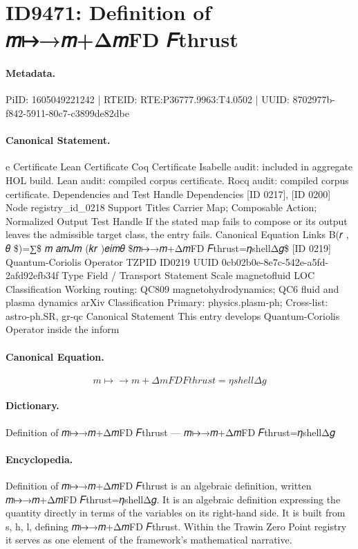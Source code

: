 \section*{ID9471: Definition of 𝑚↦→𝑚+Δ𝑚FD 𝐹thrust}
\paragraph{Metadata.}
PiID: 1605049221242 | RTEID: RTE:P36777.9963:T4.0502 | UUID: 8702977b-f842-5911-80c7-c3899de82dbe

\paragraph{Canonical Statement.}
e Certificate Lean Certificate Coq Certificate Isabelle audit: included in aggregate HOL build. Lean audit: compiled corpus certificate. Rocq audit: compiled corpus certificate. Dependencies and Test Handle Dependencies [ID 0217], [ID 0200] Node registry\_id\_0218 Support Titles Carrier Map; Composable Action; Normalized Output Test Handle If the stated map fails to compose or its output leaves the admissible target class, the entry fails. Canonical Equation Links B(𝑟 , 𝜃 \$)=∑\$ 𝑚 𝑎𝑚𝐽𝑚 (𝑘𝑟 )𝑒𝑖𝑚𝜃 \$𝑚↦→𝑚+Δ𝑚FD 𝐹thrust=𝜂shellΔ𝑔\$ [ID 0219] Quantum-Coriolis Operator TZPID ID0219 UUID 0cb02b0e-8e7c-542e-a5fd-2afd92efb34f Type Field / Transport Statement Scale magnetofluid LOC Classification Working routing: QC809 magnetohydrodynamics; QC6 fluid and plasma dynamics arXiv Classification Primary: physics.plasm-ph; Cross-list: astro-ph.SR, gr-qc Canonical Statement This entry develops Quantum-Coriolis Operator inside the inform

\paragraph{Canonical Equation.}
\[
𝑚↦→𝑚+Δ𝑚FD 𝐹thrust=𝜂shellΔ𝑔
\]

\paragraph{Dictionary.}
Definition of 𝑚↦→𝑚+Δ𝑚FD 𝐹thrust — 𝑚↦→𝑚+Δ𝑚FD 𝐹thrust=𝜂shellΔ𝑔

\paragraph{Encyclopedia.}
Definition of 𝑚↦→𝑚+Δ𝑚FD 𝐹thrust is an algebraic definition, written 𝑚↦→𝑚+Δ𝑚FD 𝐹thrust=𝜂shellΔ𝑔. It is an algebraic definition expressing the quantity directly in terms of the variables on its right-hand side. It is built from s, h, l, defining 𝑚↦→𝑚+Δ𝑚FD 𝐹thrust. Within the Trawin Zero Point registry it serves as one element of the framework's mathematical narrative.

